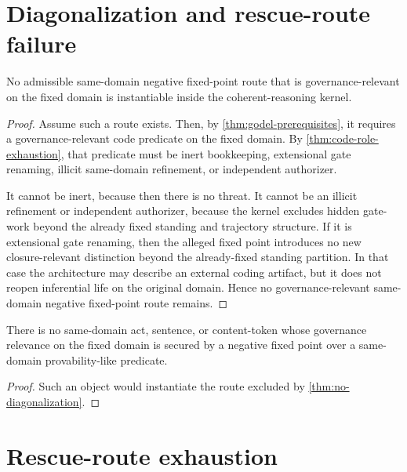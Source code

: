 \section{Diagonalization and rescue-route failure}
\label{sec:diagonal}

\begin{theorem}
\label{thm:no-diagonalization}
No admissible same-domain negative fixed-point route that is governance-relevant on the fixed domain is instantiable inside the coherent-reasoning kernel.
\end{theorem}

\begin{proof}
Assume such a route exists. Then, by \cref{thm:godel-prerequisites}, it requires a governance-relevant code predicate on the fixed domain. By \cref{thm:code-role-exhaustion}, that predicate must be inert bookkeeping, extensional gate renaming, illicit same-domain refinement, or independent authorizer.

It cannot be inert, because then there is no threat. It cannot be an illicit refinement or independent authorizer, because the kernel excludes hidden gate-work beyond the already fixed standing and trajectory structure. If it is extensional gate renaming, then the alleged fixed point introduces no new closure-relevant distinction beyond the already-fixed standing partition. In that case the architecture may describe an external coding artifact, but it does not reopen inferential life on the original domain. Hence no governance-relevant same-domain negative fixed-point route remains.
\end{proof}

\begin{corollary}
There is no same-domain act, sentence, or content-token whose governance relevance on the fixed domain is secured by a negative fixed point over a same-domain provability-like predicate.
\end{corollary}

\begin{proof}
Such an object would instantiate the route excluded by \cref{thm:no-diagonalization}.
\end{proof}

\section{Rescue-route exhaustion}
\label{sec:rescue}

